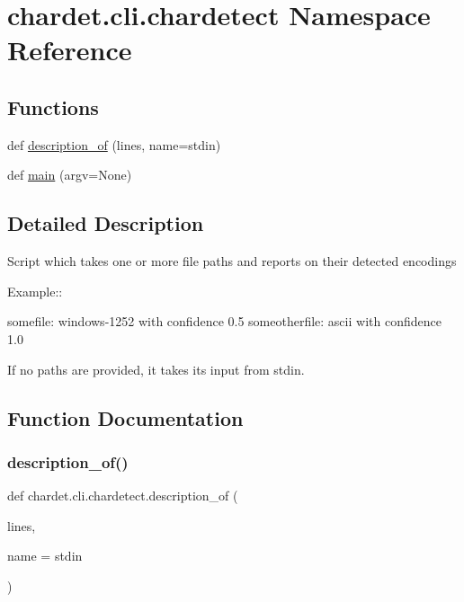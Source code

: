 \hypertarget{namespacechardet_1_1cli_1_1chardetect}{}\section{chardet.\+cli.\+chardetect Namespace Reference}
\label{namespacechardet_1_1cli_1_1chardetect}
\subsection*{Functions}
\begin{DoxyCompactItemize}
\item 
def \hyperlink{namespacechardet_1_1cli_1_1chardetect_a6f0bde6dc4e6fb80b8cd261810833998}{description\+\_\+of} (lines, name=\textquotesingle{}stdin\textquotesingle{})
\item 
def \hyperlink{namespacechardet_1_1cli_1_1chardetect_af41492a0775361976aa3864cb94f1679}{main} (argv=None)
\end{DoxyCompactItemize}


\subsection{Detailed Description}
\begin{DoxyVerb}Script which takes one or more file paths and reports on their detected
encodings

Example::

    somefile: windows-1252 with confidence 0.5
    someotherfile: ascii with confidence 1.0

If no paths are provided, it takes its input from stdin.\end{DoxyVerb}
 

\subsection{Function Documentation}
\mbox{\label{namespacechardet_1_1cli_1_1chardetect_a6f0bde6dc4e6fb80b8cd261810833998}} 
\subsubsection{\texorpdfstring{description\+\_\+of()}{description\_of()}}
{\footnotesize\ttfamily def chardet.\+cli.\+chardetect.\+description\+\_\+of (\begin{DoxyParamCaption}\item[{}]{lines,  }\item[{}]{name = {\ttfamily \textquotesingle{}stdin\textquotesingle{}} }\end{DoxyParamCaption})}

